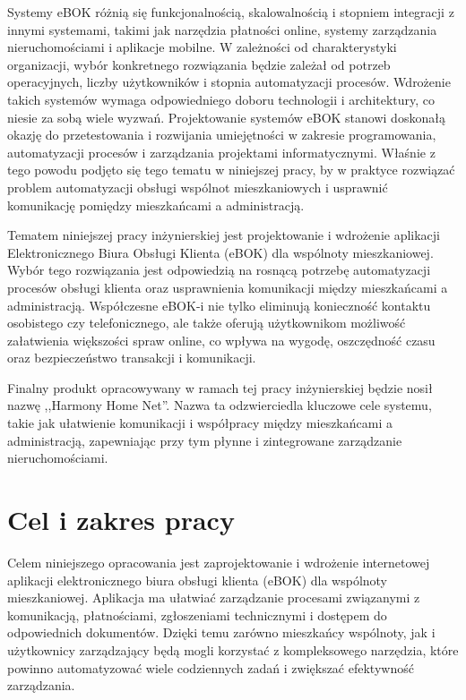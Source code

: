 Systemy eBOK różnią się funkcjonalnością, skalowalnością i stopniem integracji z innymi systemami, takimi jak narzędzia płatności online, systemy zarządzania nieruchomościami i aplikacje mobilne. W zależności od charakterystyki organizacji, wybór konkretnego rozwiązania będzie zależał od potrzeb operacyjnych, liczby użytkowników i stopnia automatyzacji procesów. Wdrożenie takich systemów wymaga odpowiedniego doboru technologii i architektury, co niesie za sobą wiele wyzwań. Projektowanie systemów eBOK stanowi doskonałą okazję do przetestowania i rozwijania umiejętności w zakresie programowania, automatyzacji procesów i zarządzania projektami informatycznymi. Właśnie z tego powodu podjęto się tego tematu w niniejszej pracy, by w praktyce rozwiązać problem automatyzacji obsługi wspólnot mieszkaniowych i usprawnić komunikację pomiędzy mieszkańcami a administracją.

Tematem niniejszej pracy inżynierskiej jest projektowanie i wdrożenie aplikacji Elektronicznego Biura Obsługi Klienta (eBOK) dla wspólnoty mieszkaniowej. Wybór tego rozwiązania jest odpowiedzią na rosnącą potrzebę automatyzacji procesów obsługi klienta oraz usprawnienia komunikacji między mieszkańcami a administracją. Współczesne eBOK-i nie tylko eliminują konieczność kontaktu osobistego czy telefonicznego, ale także oferują użytkownikom możliwość załatwienia większości spraw online, co wpływa na wygodę, oszczędność czasu oraz bezpieczeństwo transakcji i komunikacji.

Finalny produkt opracowywany w ramach tej pracy inżynierskiej będzie nosił nazwę ,,Harmony Home Net''. Nazwa ta odzwierciedla kluczowe cele systemu, takie jak ułatwienie komunikacji i współpracy między mieszkańcami a administracją, zapewniając przy tym płynne i zintegrowane zarządzanie nieruchomościami.



\section{Cel i zakres pracy}


Celem niniejszego opracowania jest zaprojektowanie i wdrożenie internetowej aplikacji elektronicznego biura obsługi klienta (eBOK) dla wspólnoty mieszkaniowej. Aplikacja ma ułatwiać zarządzanie procesami związanymi z komunikacją, płatnościami, zgłoszeniami technicznymi i dostępem do odpowiednich dokumentów. Dzięki temu zarówno mieszkańcy wspólnoty, jak i użytkownicy zarządzający będą mogli korzystać z kompleksowego narzędzia, które powinno automatyzować wiele codziennych zadań i zwiększać efektywność zarządzania.

